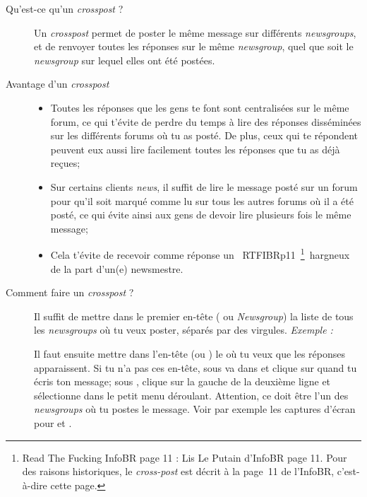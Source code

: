 \begin{description}

\item[Qu'est-ce qu'un \emph{crosspost} ?]
Un \emph{crosspost} permet de poster le même message sur différents \emph{newsgroups}, et de renvoyer toutes les réponses sur le même \emph{newsgroup}, quel
que soit le \emph{newsgroup} sur lequel elles ont été postées.

\item[Avantage d'un \emph{crosspost}]
\begin{itemize}
 \item Toutes les réponses que les gens te font sont centralisées sur le même forum,
       ce qui t'évite de perdre du temps à lire des réponses disséminées
       sur les différents forums où tu as posté.
       De plus, ceux qui te répondent peuvent eux aussi lire facilement toutes les réponses
       que tu as déjà reçues;
 \item Sur certains clients \emph{news}, il suffit de lire le message posté sur un forum
       pour qu'il soit marqué comme lu sur tous les autres forums où il a été posté,
       ce qui évite ainsi aux gens de devoir lire plusieurs fois le même message;
 \item Cela t'évite de recevoir comme réponse un \guillemotleft~RTFIBRp11~\footnote{Read The Fucking InfoBR page 11 : Lis Le Putain d'InfoBR page 11. Pour des raisons historiques, le \emph{cross-post} est décrit à la page~11 de l'InfoBR, c'est-à-dire cette page.}~\guillemotright  hargneux de la part d'un(e) newsmestre.
\end{itemize}

\item[Comment faire un \emph{crosspost} ?]
Il suffit de mettre dans le premier en-tête ( ou \emph{Newsgroup}) la liste de tous les \emph{newsgroups} où tu veux
poster, séparés par des virgules. \emph{Exemple :} 

Il faut ensuite mettre dans l'en-tête  (ou ) le  où tu veux que les réponses apparaissent. Si
tu n'a pas ces en-tête, sous  va dans  et clique sur  quand tu écris ton message; sous
, clique sur la gauche de la deuxième ligne et sélectionne  dans le petit menu déroulant. Attention, ce doit être
l'un des \emph{newsgroups} où tu postes le message.
Voir par exemple les captures d'écran pour  et .\\


\end{description}
